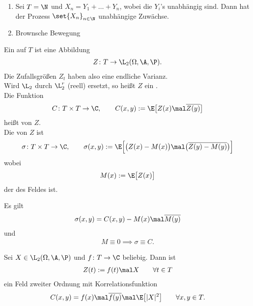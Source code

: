\begin{beisp}
	\begin{enumerate}
		\item Sei $T=\N$ und $X_n=Y_1+\ldots+Y_n$, wobei die $Y_i$'s unabhängig sind.
	Dann hat der Prozess $\set{X_n}_{n\in\N}$ unabhängige Zuwächse.
		\item Brownsche Bewegung
	\end{enumerate}
\end{beisp}

\begin{definition}
	Ein  auf $T$ ist eine Abbildung
	\begin{align*}
		Z\colon T\to \L_2(\Omega,\A,\P).
	\end{align*}
	Die Zufallsgrößen $Z_t$ haben also eine endliche Varianz.\\
	Wird $\L_2$ durch $\L_2^r$ (reell) ersetzt, so heißt $Z$ ein .\\
	Die Funktion 
	\begin{align*}
		C\colon T\times T\to\C,\qquad
		C(x,y):=\E\big[Z(x)\mal\overline{Z(y)}\big]
	\end{align*}
	heißt  von $Z$.\\
	Die  von $Z$ ist
	\begin{align*}
		\sigma\colon T\times T\to\C,\qquad
		\sigma(x,y):=\E\Big[\big(Z(x)-M(x)\big)\mal\big(\overline{Z(y)-M(y)}\big)\Big]\\
	\end{align*}
	wobei 
	\begin{align*}
		M(x):=\E\big[Z(x)\big]
	\end{align*}
	der  des Feldes ist.
\end{definition}

\begin{lem}
	Es gilt
	\begin{align*}
		\sigma(x,y)=C(x,y)-M(x)\mal\overline{M(y)}
	\end{align*}
	und
	\begin{align*}
		M\equiv 0\implies \sigma\equiv C.
	\end{align*}
\end{lem}

\begin{beisp}
	Sei $X\in\L_2(\Omega,\A,\P)$ und $f\colon T\to\C$ beliebig.
	Dann ist
	\begin{align*}
		Z(t):=f(t)\mal X\qquad\forall t\in T
	\end{align*}
	ein Feld zweiter Ordnung mit Korrelationsfunktion
	\begin{align*}
		C(x,y)=f(x)\mal\overline{f(y)}\mal\E\big[|X|^2\big] \qquad\forall x,y\in T.
	\end{align*}
\end{beisp}
